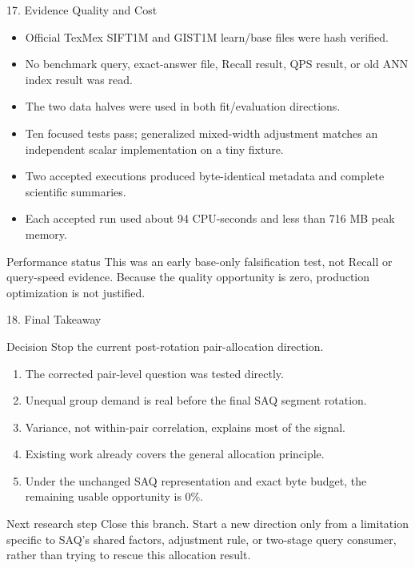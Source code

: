 \documentclass[aspectratio=169]{beamer}
\begin{document}
\begin{frame}{17. Evidence Quality and Cost}
\small
\begin{itemize}
  \item Official TexMex SIFT1M and GIST1M learn/base files were hash verified.
  \item No benchmark query, exact-answer file, Recall result, QPS result, or
  old ANN index result was read.
  \item The two data halves were used in both fit/evaluation directions.
  \item Ten focused tests pass; generalized mixed-width adjustment matches an
  independent scalar implementation on a tiny fixture.
  \item Two accepted executions produced byte-identical metadata and complete
  scientific summaries.
  \item Each accepted run used about 94 CPU-seconds and less than 716 MB peak
  memory.
\end{itemize}
\begin{block}{Performance status}
This was an early base-only falsification test, not Recall or query-speed
evidence. Because the quality opportunity is zero, production optimization is
not justified.
\end{block}
\end{frame}

\begin{frame}{18. Final Takeaway}
\begin{alertblock}{Decision}
Stop the current post-rotation pair-allocation direction.
\end{alertblock}
\begin{enumerate}
  \item The corrected pair-level question was tested directly.
  \item Unequal group demand is real before the final SAQ segment rotation.
  \item Variance, not within-pair correlation, explains most of the signal.
  \item Existing work already covers the general allocation principle.
  \item Under the unchanged SAQ representation and exact byte budget, the
  remaining usable opportunity is 0\%.
\end{enumerate}
\begin{block}{Next research step}
Close this branch. Start a new direction only from a limitation specific to
SAQ's shared factors, adjustment rule, or two-stage query consumer, rather
than trying to rescue this allocation result.
\end{block}
\end{frame}
\end{document}
